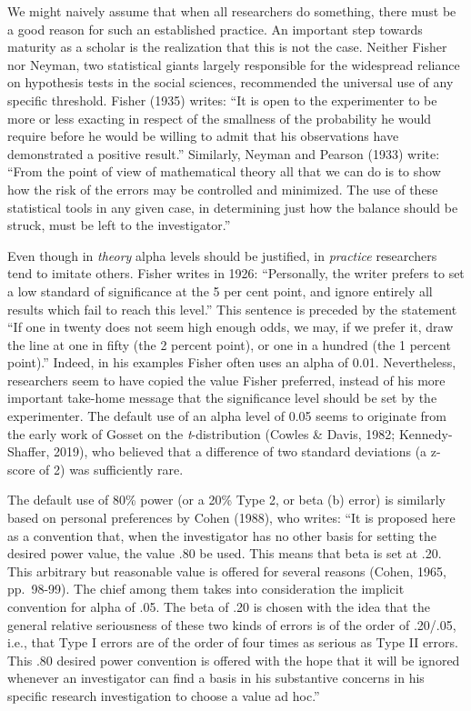 \documentclass[
  english,
  ,jou, a4paper,floatsintext]{apa6}
\begin{document}
We might naively assume that when all researchers do something, there must be a good reason for such an established practice. An important step towards maturity as a scholar is the realization that this is not the case. Neither Fisher nor Neyman, two statistical giants largely responsible for the widespread reliance on hypothesis tests in the social sciences, recommended the universal use of any specific threshold. Fisher (1935) writes: ``It is open to the experimenter to be more or less exacting in respect of the smallness of the probability he would require before he would be willing to admit that his observations have demonstrated a positive result.'' Similarly, Neyman and Pearson (1933) write: ``From the point of view of mathematical theory all that we can do is to show how the risk of the errors may be controlled and minimized. The use of these statistical tools in any given case, in determining just how the balance should be struck, must be left to the investigator.''

Even though in \emph{theory} alpha levels should be justified, in \emph{practice} researchers tend to imitate others. Fisher writes in 1926: ``Personally, the writer prefers to set a low standard of significance at the 5 per cent point, and ignore entirely all results which fail to reach this level.'' This sentence is preceded by the statement ``If one in twenty does not seem high enough odds, we may, if we prefer it, draw the line at one in fifty (the 2 percent point), or one in a hundred (the 1 percent point).'' Indeed, in his examples Fisher often uses an alpha of 0.01. Nevertheless, researchers seem to have copied the value Fisher preferred, instead of his more important take-home message that the significance level should be set by the experimenter. The default use of an alpha level of 0.05 seems to originate from the early work of Gosset on the \emph{t}-distribution (Cowles \& Davis, 1982; Kennedy-Shaffer, 2019), who believed that a difference of two standard deviations (a z-score of 2) was sufficiently rare.

The default use of 80\% power (or a 20\% Type 2, or beta (b) error) is similarly based on personal preferences by Cohen (1988), who writes: ``It is proposed here as a convention that, when the investigator has no other basis for setting the desired power value, the value .80 be used. This means that beta is set at .20. This arbitrary but reasonable value is offered for several reasons (Cohen, 1965, pp.~98-99). The chief among them takes into consideration the implicit convention for alpha of .05. The beta of .20 is chosen with the idea that the general relative seriousness of these two kinds of errors is of the order of .20/.05, i.e., that Type I errors are of the order of four times as serious as Type II errors. This .80 desired power convention is offered with the hope that it will be ignored whenever an investigator can find a basis in his substantive concerns in his specific research investigation to choose a value ad hoc.''
\end{document}
